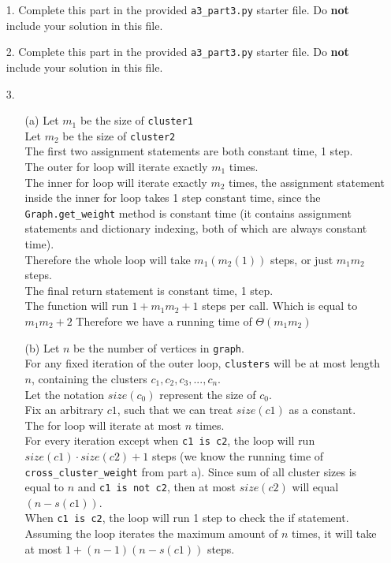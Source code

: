\documentclass[11pt]{article}
\begin{document}
\begin{enumerate}

\item[1.]
Complete this part in the provided \texttt{a3\_part3.py} starter file.
Do \textbf{not} include your solution in this file.

\item[2.]
Complete this part in the provided \texttt{a3\_part3.py} starter file.
Do \textbf{not} include your solution in this file.

\item[3.]

\begin{enumerate}
\item[(a)]
Let $m_1$ be the size of \texttt{cluster1} \\
Let $m_2$ be the size of \texttt{cluster2} \\

The first two assignment statements are both constant time, 1 step. \\
The outer for loop will iterate exactly $m_1$ times. \\
The inner for loop will iterate exactly $m_2$ times, the assignment statement inside the inner for loop takes 1 step constant time, since the \texttt{Graph.get\_weight} method is constant time (it contains assignment statements and dictionary indexing, both of which are always constant time). \\
Therefore the whole loop will take $m_1(m_2(1))$ steps, or just $m_1m_2$ steps. \\
The final return statement is constant time, 1 step. \\

The function will run $1 + m_1m_2 + 1$ steps per call. Which is equal to $m_1m_2 + 2$ Therefore we have a running time of $\Theta(m_1m_2)$ \\

\item[(b)]
Let $n$ be the number of vertices in \texttt{graph}. \\
For any fixed iteration of the outer loop, \texttt{clusters} will be at most length $n$, containing the clusters $c_1, c_2, c_3, ..., c_n$. \\
Let the notation $size(c_0)$ represent the size of $c_0$. \\
Fix an arbitrary $c1$, such that we can treat $size(c1)$ as a constant. \\

The for loop will iterate at most $n$ times. \\
For every iteration except when \texttt{c1 is c2}, the loop will run $size(c1) \cdot size(c2) + 1$ steps (we know the running time of \texttt{cross\_cluster\_weight} from part a). Since sum of all cluster sizes is equal to $n$ and \texttt{c1 is not c2}, then at most $size(c2)$ will equal $(n - s(c1))$. \\
When \texttt{c1 is c2}, the loop will run 1 step to check the if statement. \\
Assuming the loop iterates the maximum amount of $n$ times, it will take at most $1 + (n - 1)(n - s(c1))$ steps. \\


\end{enumerate}
\end{enumerate}
\end{document}
